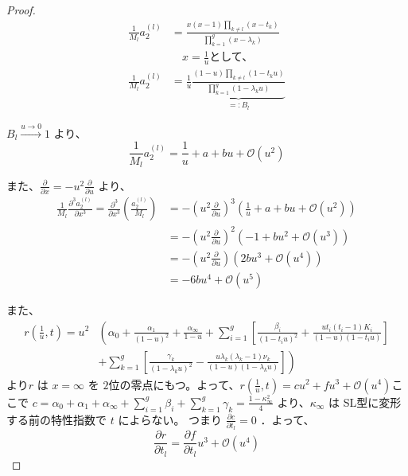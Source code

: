 \documentclass[paper=a4, fontsize=11pt]{jlreq} %
\newenvironment{story}{%
  \begin{mdframed}[
    backgroundcolor=red!5, %
    linewidth=0pt,         %
    innertopmargin=10pt,   %
    innerbottommargin=10pt,
    innerrightmargin=10pt, %
    innerleftmargin=10pt
  ]%
}{%
  \end{mdframed}%
}
\theoremstyle{break}
\theoremstyle{qa}
\begin{document}
\begin{story}
\begin{proof}
\begin{align*}
\frac{1}{M_l} a_2^{(l)} &= \frac{x(x-1) \prod_{k \neq l} (x-t_k)}{\prod_{k=1}^g (x-\lambda_k)} \\
&\quad x = \frac{1}{u} \text{として、} \\
\frac{1}{M_l} a_2^{(l)} &= \frac{1}{u} \underbrace{\frac{(1-u) \prod_{k \neq l} (1-t_k u)}{\prod_{k=1}^g (1-\lambda_k u)}}_{=: B_l}
\end{align*}

$B_l \xrightarrow{u \to 0} 1$ より、
\begin{equation*}
\frac{1}{M_l} a_2^{(l)} = \frac{1}{u} + a + b u + \mathcal{O}(u^2)
\end{equation*}

また、$\frac{\partial}{\partial x} = -u^2 \frac{\partial}{\partial u}$ より、
\begin{align*}
\frac{1}{M_l} \frac{\partial^3 a_2^{(l)}}{\partial x^3} = \frac{\partial^3}{\partial x^3} \left( \frac{a_2^{(l)}}{M_l} \right) &= - \left( u^2 \frac{\partial}{\partial u} \right)^3 \left( \frac{1}{u} + a + b u + \mathcal{O}(u^2) \right) \\
&= - \left( u^2 \frac{\partial}{\partial u} \right)^2 \left( -1 + b u^2 + \mathcal{O}(u^3) \right) \\
&= - \left( u^2 \frac{\partial}{\partial u} \right) \left( 2 b u^3 + \mathcal{O}(u^4) \right) \\
&= -6 b u^4 + \mathcal{O}(u^5)
\end{align*}

また、
\begin{align*}
r\left(\frac{1}{u}, t\right) = u^2& \left( \alpha_0 + \frac{\alpha_1}{(1-u)^2} + \frac{\alpha_\infty}{1-u} + \sum_{i=1}^g \left[ \frac{\beta_i}{(1-t_i u)^2} + \frac{u t_i(t_i-1) K_i}{(1-u)(1-t_i u)} \right]\right. \\
&\left.+ \sum_{k=1}^g \left[ \frac{\gamma_k}{(1-\lambda_k u)^2} - \frac{u \lambda_k(\lambda_k-1) \nu_k}{(1-u)(1-\lambda_k u)} \right] \right) 
\end{align*}
より$r$ は $x = \infty$ を $2$位の零点にもつ。よって、$r\left(\frac{1}{u}, t\right) = c u^2 + f u^3 + \mathcal{O}(u^4)$ここで $c = \alpha_0 + \alpha_1 + \alpha_\infty + \sum_{i=1}^g \beta_i + \sum_{k=1}^g \gamma_k = \frac{1-\kappa_\infty^2}{4}$ より、$\kappa_\infty$ は SL型に変形する前の特性指数で $t$ によらない。
つまり $\frac{\partial c}{\partial t_l} = 0$ ．よって、
\begin{equation*}
\frac{\partial r}{\partial t_l} = \frac{\partial f}{\partial t_l} u^3 + \mathcal{O}(u^4)
\end{equation*}


\end{proof}
\end{story}
\end{document}
